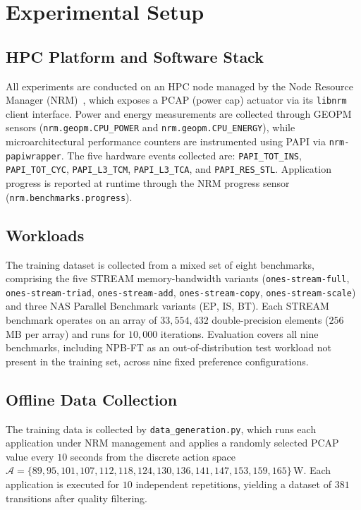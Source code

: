   \section{Experimental Setup}
  \label{sec:experimental_setup}

  \subsection{HPC Platform and Software Stack}

  All experiments are conducted on an HPC node managed by the Node Resource
  Manager (NRM)~\cite{nrm}, which exposes a PCAP (power cap) actuator via its
  \texttt{libnrm} client interface. Power and energy measurements are collected
  through GEOPM sensors (\texttt{nrm.geopm.CPU\_POWER} and
  \texttt{nrm.geopm.CPU\_ENERGY}), while microarchitectural performance counters
  are instrumented using PAPI via \texttt{nrm-papiwrapper}. The five hardware
  events collected are: \texttt{PAPI\_TOT\_INS}, \texttt{PAPI\_TOT\_CYC},
  \texttt{PAPI\_L3\_TCM}, \texttt{PAPI\_L3\_TCA}, and \texttt{PAPI\_RES\_STL}.
  Application progress is reported at runtime through the NRM progress sensor
  (\texttt{nrm.benchmarks.progress}).

  \subsection{Workloads}

  The training dataset is collected from a mixed set of eight benchmarks,
  comprising the five STREAM memory-bandwidth variants (\texttt{ones-stream-full},
  \texttt{ones-stream-triad}, \texttt{ones-stream-add}, \texttt{ones-stream-copy},
  \texttt{ones-stream-scale}) and three NAS Parallel Benchmark variants
  (\textsc{EP}, \textsc{IS}, \textsc{BT}). Each STREAM benchmark operates on an
  array of $33{,}554{,}432$ double-precision elements ($256$\,MB per array) and
  runs for $10{,}000$ iterations. Evaluation covers all nine benchmarks, including
  NPB-FT as an out-of-distribution test workload not present in the training set,
  across nine fixed preference configurations.

  \subsection{Offline Data Collection}
  \label{sec:data_collection}

  The training data is collected by \texttt{data\_generation.py}, which runs each
  application under NRM management and applies a randomly selected PCAP value
  every $10$ seconds from the discrete action space
  $\mathcal{A} = \{89, 95, 101, 107, 112, 118, 124, 130, 136, 141, 147, 153,
  159, 165\}$\,W. Each application is executed for $10$ independent repetitions,
  yielding a dataset of $381$ transitions after quality filtering.

